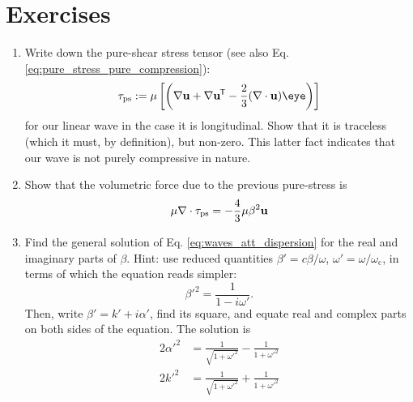 \section{Exercises}
\begin{enumerate}

\item \label{ex:shear_in_wave} Write down the pure-shear stress tensor
  (see also Eq. \ref{eq:pure_stress_pure_compression}):
  \[
    \tau_\mathrm{ps} :=
    \mu  \left[
      \left(
        \nabla\bfu + \nabla\bfu\tran  - \frac23 (\divu)  \eye
      \right)
    \right] 
  \]
  for our linear wave \label{eq:wave_form_visc} in the case it is
  longitudinal. Show that it is traceless (which it must, by
  definition), but non-zero. This latter fact indicates that our wave
  is not purely compressive in nature.
 
\item \label{ex:div_of_traceless} Show that the volumetric force due
  to the previous pure-stress is
  \[
   \mu \nabla \cdot  \tau_\mathrm{ps}  = -\frac43 \mu \beta^2 \mathbf{u}
  \]

\item Find the general solution of Eq. \ref{eq:waves_att_dispersion}
  for the real and imaginary parts of $\beta$. Hint: use reduced
  quantities $\beta'= c\beta/\omega $,
  $\omega'=\omega/\omega_\mathrm{c}$, in terms of which the equation
  reads simpler:
  \[
    \beta'^2 = \frac{1}{1-i \omega'} .
  \]
  Then, write $\beta'=k'+i \alpha'$, find its square, and equate real
  and complex parts on both sides of the equation.  The solution is
  \begin{align*}
    2\alpha'^2 &=\frac {1}{\sqrt{1+\omega'^{2}}} - \frac {1}{1+\omega'^{2}} \\
    2k'^2     &=\frac {1}{\sqrt{1+\omega'^{2}}} + \frac {1}{1+\omega'^{2}}
  \end{align*}

  
\end{enumerate}